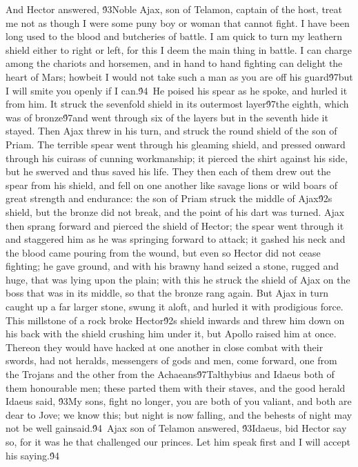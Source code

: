 {And Hector answered, \'93Noble Ajax, son of Telamon, captain of the host, treat me not as though I were some puny boy or woman that cannot fight. I have been long used to the blood and butcheries of battle. I am quick to turn my leathern shield either to right or left, for this I deem the main thing in battle. I can charge among the chariots and horsemen, and in hand to hand fighting can delight the heart of Mars; howbeit I would not take such a man as you are off his guard\'97but I will smite you openly if I can.\'94\
He poised his spear as he spoke, and hurled it from him. It struck the sevenfold shield in its outermost layer\'97the eighth, which was of bronze\'97and went through six of the layers but in the seventh hide it stayed. Then Ajax threw in his turn, and struck the round shield of the son of Priam. The terrible spear went through his gleaming shield, and pressed onward through his cuirass of cunning workmanship; it pierced the shirt against his side, but he swerved and thus saved his life. They then each of them drew out the spear from his shield, and fell on one another like savage lions or wild boars of great strength and endurance: the son of Priam struck the middle of Ajax\'92s shield, but the bronze did not break, and the point of his dart was turned. Ajax then sprang forward and pierced the shield of Hector; the spear went through it and staggered him as he was springing forward to attack; it gashed his neck and the blood came pouring from the wound, but even so Hector did not cease fighting; he gave ground, and with his brawny hand seized a stone, rugged and huge, that was lying upon the plain; with this he struck the shield of Ajax on the boss that was in its middle, so that the bronze rang again. But Ajax in turn caught up a far larger stone, swung it aloft, and hurled it with prodigious force. This millstone of a rock broke Hector\'92s shield inwards and threw him down on his back with the shield crushing him under it, but Apollo raised him at once. Thereon they would have hacked at one another in close combat with their swords, had not heralds, messengers of gods and men, come forward, one from the Trojans and the other from the Achaeans\'97Talthybius and Idaeus both of them honourable men; these parted them with their staves, and the good herald Idaeus said, \'93My sons, fight no longer, you are both of you valiant, and both are dear to Jove; we know this; but night is now falling, and the behests of night may not be well gainsaid.\'94\
Ajax son of Telamon answered, \'93Idaeus, bid Hector say so, for it was he that challenged our princes. Let him speak first and I will accept his saying.\'94\
}
